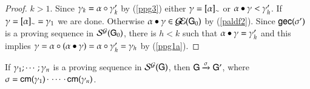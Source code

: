\begin{proof}
$k>1$. 
 Since $\gamma_k={\alpha}\circ{\ensuremath{\gamma}'_k}$ by (\ref{ppg3})
    either $\gamma=[\alpha]_{\sim}$ or ${\alpha}\bullet{\ensuremath{\gamma}}<\gamma'_h$. %
    If $\gamma=[\alpha]_{\sim}=\gamma_1$ we are done. Otherwise ${\alpha}\bullet{\ensuremath{\gamma}}\in\mathcal{G\!E}({\sf G}_0)$ by (\ref{paldf2}).  
 Since  ${\sf gec}(\sigma')$  is a proving
    sequence in $\mathcal{S}^{\mathcal{G}}({\sf G}_0)$, there is $h<k$ such that ${\alpha}\bullet{\ensuremath{\gamma}}=\gamma_h'$ and this implies $\gamma={\alpha}\circ{(\ensuremath{{\alpha}\bullet{\ensuremath{\gamma}}})}={\alpha}\circ{\ensuremath{\gamma}_h'}=\gamma_h$  by (\ref{ppg1a}). 
\end{proof}


%
\begin{theorem}
  If $\gamma_1;\cdots;\gamma_n$ is a proving sequence in $
  \mathcal{S}^{\mathcal{G}}( {\sf G})$, then $ {\sf G}\xrightarrow{\sigma} {\sf G}'$, where
  $\sigma={\sf cm}(\gamma_1)\,{\cdot}\,\cdots\,{\cdot}\,{\sf cm}(\gamma_n)$.
\end{theorem}

